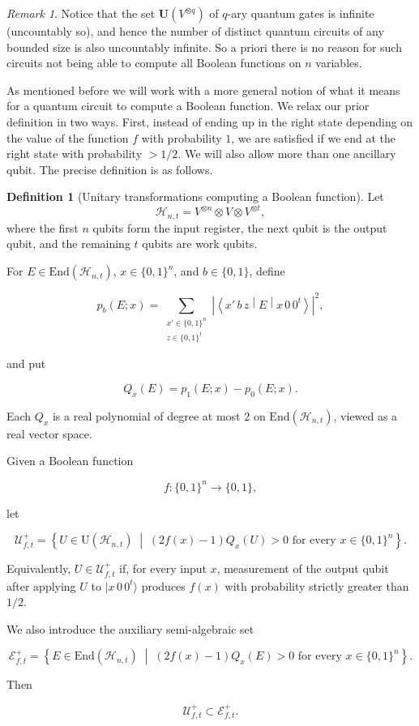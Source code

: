 \documentclass[10pt]{amsart}
\theoremstyle{definition}
\newtheorem{definition}{Definition}[section]
\theoremstyle{remark}
\newtheorem{remark}{Remark}
\numberwithin{equation}{section}
\newcommand{\End}{\mathrm{End}}
\begin{document}
\begin{remark}
Notice that the set $\mathbf{U}(V^{\otimes q})$ of $q$-ary quantum gates 
is infinite (uncountably so), and hence the number of 
distinct quantum circuits of any bounded size is also uncountably infinite. So a priori there is no reason for such circuits not being able to compute all Boolean functions on $n$ variables.
\end{remark}



As mentioned before we will work with a more general notion of what it means for a 
quantum circuit to compute a Boolean function. We relax our prior definition in two
ways. First, instead of ending up in the right state depending on the value of the function $f$ 
with probability $1$, we are satisfied if we end at the right state with probability $> 1/2$.
We will also allow more than one ancillary qubit. The precise  definition is as follows.


\begin{definition}[Unitary transformations computing a Boolean function]
\label{def:quantum-boolean}
Let
$$
\mathcal H_{n,t}
=
V^{\otimes n}\otimes V\otimes V^{\otimes t},
$$
where the first \(n\) qubits form the input register, the next qubit is the
output qubit, and the remaining \(t\) qubits are work qubits.

For \(E\in \End(\mathcal H_{n,t})\), \(x\in\{0,1\}^{n}\), and
\(b\in\{0,1\}\), define

$$
p_b(E;x)
=
\sum_{\substack{x'\in\{0,1\}^{n}\\ z\in\{0,1\}^{t}}}
\left|
\left\langle x'\,b\,z
\middle|
E
\middle|
x\,0\,0^{t}
\right\rangle
\right|^{2},
$$

and put

$$
Q_x(E)=p_1(E;x)-p_0(E;x).
$$

Each \(Q_x\) is a real polynomial of degree at most \(2\) on
\(\End(\mathcal H_{n,t})\), viewed as a real vector space.

Given a Boolean function

$$
f:\{0,1\}^{n}\longrightarrow\{0,1\},
$$

let

$$
\mathcal U^{+}_{f,t}
=
\left\{
U\in \mathrm U(\mathcal H_{n,t})
\;\middle|\;
(2f(x)-1)Q_x(U)>0
\text{ for every }x\in\{0,1\}^{n}
\right\}.
$$

Equivalently, \(U\in\mathcal U^{+}_{f,t}\) if, for every input \(x\),
measurement of the output qubit after applying \(U\) to
\(\lvert x\,0\,0^{t}\rangle\) produces \(f(x)\) with probability strictly
greater than \(1/2\).

We also introduce the auxiliary semi-algebraic set

$$
\mathcal E^{+}_{f,t}
=
\left\{
E\in \End(\mathcal H_{n,t})
\;\middle|\;
(2f(x)-1)Q_x(E)>0
\text{ for every }x\in\{0,1\}^{n}
\right\}.
$$

Then

$$
\mathcal U^{+}_{f,t}\subset \mathcal E^{+}_{f,t}.
$$

\end{definition}
\end{document}
